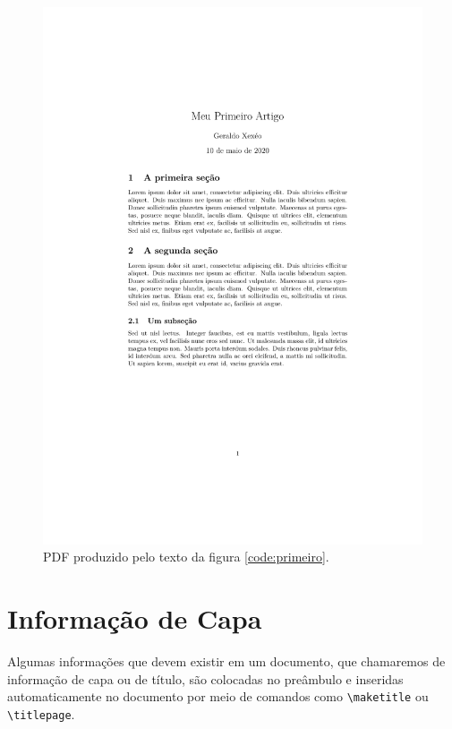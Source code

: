 \begin{figure}
    \centering
    \includegraphics[height=.8\textheight,frame]{primeiroartigo}
    \caption{PDF produzido pelo texto da figura \ref{code:primeiro}.}
    \label{fig:primeiroartigo}
\end{figure}


\section{Informação de Capa}

Algumas informações que devem existir em um documento, que chamaremos de informação de capa ou de título, são colocadas no preâmbulo e inseridas automaticamente no documento por meio de comandos como 
\lstinline|\maketitle| ou \lstinline|\titlepage|. 

